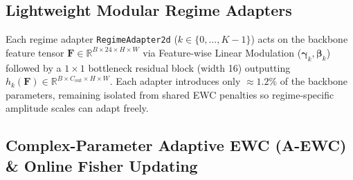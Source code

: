 \documentclass[11pt,a4paper]{article}
\begin{document}
\subsection{Lightweight Modular Regime Adapters}

Each regime adapter \texttt{RegimeAdapter2d} ($k \in \{0, \dots, K-1\}$) acts on the backbone feature tensor $\mathbf{F} \in \mathbb{R}^{B \times 24 \times H \times W}$ via Feature-wise Linear Modulation ($\boldsymbol{\gamma}_k, \boldsymbol{\beta}_k$) followed by a $1 \times 1$ bottleneck residual block (width 16) outputting $h_k(\mathbf{F}) \in \mathbb{R}^{B \times C_{\text{out}} \times H \times W}$. Each adapter introduces only $\approx 1.2\%$ of the backbone parameters, remaining isolated from shared EWC penalties so regime-specific amplitude scales can adapt freely.

\subsection{Complex-Parameter Adaptive EWC (A-EWC) \& Online Fisher Updating}
\end{document}
